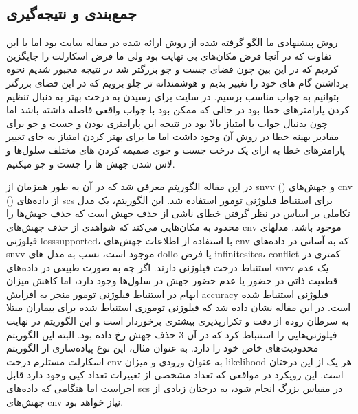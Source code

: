 \subsection{جمع‌بندی و نتیجه‌گیری}
روش پیشنهادی ما الگو گرفته شده از روش ارائه شده در مقاله سایت بود اما با این تفاوت که در آنجا فرض مکان‌های بی نهایت بود ولی ما فرض اسکارلت را جایگزین کردیم که در این بین چون فضای جست و جو بزرگتر شد در نتیجه مجبور شدیم نحوه برداشتن گام های خود را تغییر بدیم و هوشمندانه تر جلو برویم که در این فضای بزرگتر بتوانیم به جواب مناسب برسیم. در سایت برای رسیدن به درخت بهتر به دنبال تنظیم کردن پارامترهای خطا بود در حالی که ممکن بود با جواب واقعی فاصله داشته باشد اما چون بدنبال جواب با امتیاز بالا بود در نتیجه این پارامتری بودن و جست و جو برای مقادیر بهینه خطا در روش آن وجود داشت اما ما برای بهتر کردن امتیاز به جای تغییر پارامترهای خطا به ازای یک درخت جست و جوی ضمیمه کردن های مختلف سلول‌ها و لاس شدن جهش ها را جست و جو میکنیم.




\newpage

در این مقاله الگوریتم  معرفی شد که در آن به طور همزمان از \gls{snvv} () و جهش‌های \gls{cnv} () از داده‌های \gls{scs} برای استنباط فیلوژنی تومور استفاده شد. این الگوریتم، یک مدل تکاملی بر اساس در نظر گرفتن خطای ناشی از حذف جهش است که حذف جهش‌ها را محدود به مکان‌هایی می‌کند که شواهدی از حذف جهش‌های \gls{cnv} موجود باشد. مدلهای فیلوژنی \gls{losssupported}،  با استفاده از اطلاعات جهش‌های \gls{cnv} که به آسانی در داده‌های \gls{snvv} موجود است، نسب به مدل های \gls{dollo} یا فرض \gls{infinitesites}، \gls{conflict} کمتری در استنباط درخت فیلوژنی دارند. اگر چه به صورت طبیعی در داده‌های \gls{snvv} یک عدم قطعیت ذاتی در حضور یا عدم حضور جهش در سلول‌ها وجود دارد، اما کاهش میزان ابهام در استنباط فیلوژنی تومور منجر به افزایش \gls{accuracy} فیلوژنی استنباط شده است. در این مقاله نشان داده شد که فیلوژنی توموری استنباط شده برای بیماران مبتلا به سرطان روده از دقت و تکرارپذیری بیشتری برخوردار است و این الگوریتم در نهایت فیلوژنی‌هایی را استنباط کرد که در آن 3 حذف جهش رخ داده بود. البته این الگوریتم محدودیت‌های خاص خود را دارد. به عنوان مثال، این نوع پیاده‌سازی از الگوریتم اسکارلت مستلزم درخت \gls{cnv} به عنوان ورودی و میزان \gls{likelihood} هر یک از این درختان است. این رویکرد در مواقعی که تعداد مشخصی از تغییرات تعداد کپی وجود دارد قابل اجراست اما هنگامی که داده‌های \gls{scs} در مقیاس بزرگ انجام شود، به درختان زیادی از جهش‌های \gls{cnv} نیاز خواهد بود. 








